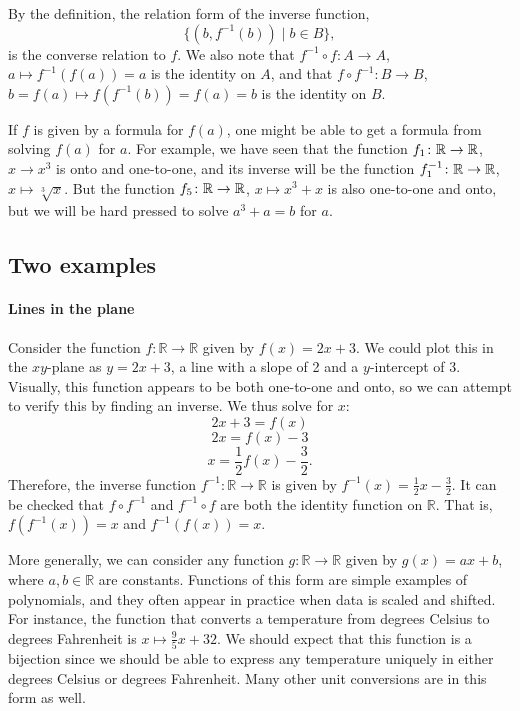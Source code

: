 By the definition, the relation form of the inverse function,
\[
\{(b,f^{-1}(b))\mid b\in B\},
\]
is the converse relation to $f$. We also
note that $f^{-1}\circ f\colon A\to A$, $a\mapsto f^{-1}(f(a))=a$ is the identity
on $A$, and that $f\circ f^{-1}\colon B\to B$, $b=f(a)\mapsto f(f^{-1}(b))=f(a)=b$ is
the identity on $B$.
\medskip

If $f$ is given by a formula for $f(a)$, one might be able to get a formula  from
solving $f(a)$ for $a$. For example, we have seen that the function $f_1\colon{\mathbb R}\to{\mathbb R}$,
$x\to x^3$ is onto and one-to-one, and its inverse will be the function
$f_1^{-1}\colon{\mathbb R}\to{\mathbb R}$, $x\mapsto\sqrt[3]{x}$. But the function $f_5\colon{\mathbb R}\to{\mathbb R}$,
$x\mapsto x^3+x$ is also one-to-one and  onto, but we will be hard pressed to solve
$a^3+a=b$ for $a$.

\subsection{Two examples}

\paragraph{Lines in the plane}
Consider the function $f \colon \mathbb{R} \to \mathbb{R}$ given by $f(x) = 2x+3$.
We could plot this in the $xy$-plane as $y=2x+3$, a line with a slope of 2 and a $y$-intercept of 3.
Visually, this function appears to be both one-to-one and onto, so we can attempt to verify this by finding an inverse.
We thus solve for $x$:
\[
2x+3 = f(x)
\]
\[
2x = f(x)-3
\]
\[
x = \frac{1}{2}f(x) - \frac{3}{2}.
\]
Therefore, the inverse function $f^{-1} \colon \mathbb{R} \to \mathbb{R}$ is given by $f^{-1}(x) = \frac{1}{2}x - \frac{3}{2}$.
It can be checked that $f \circ f^{-1}$ and $f^{-1} \circ f$ are both the identity function on $\mathbb{R}$.  That is, $f(f^{-1}(x)) = x$ and $f^{-1}(f(x))=x$.

More generally, we can consider any function $g \colon \mathbb{R} \to \mathbb{R}$ given by $g(x) = ax+b$, where $a,b \in \mathbb{R}$ are constants.
Functions of this form are simple examples of polynomials, and they often appear in practice when data is scaled and shifted.
For instance, the function that converts a temperature from degrees Celsius to degrees Fahrenheit is $x \mapsto \frac{9}{5} x + 32$.
We should expect that this function is a bijection since we should be able to express any temperature uniquely in either degrees Celsius or degrees Fahrenheit.
Many other unit conversions are in this form as well.

